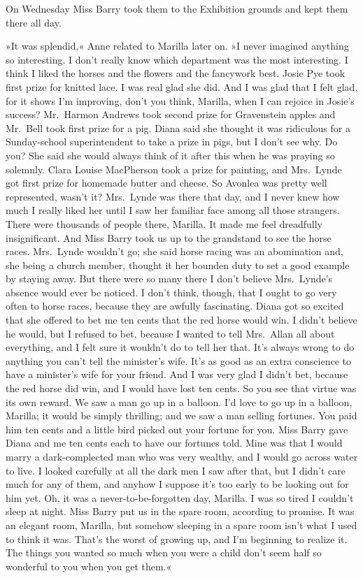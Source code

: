 On Wednesday Miss Barry took them to the Exhibition grounds and kept them there all day.

»It was splendid,« Anne related to Marilla later on. »I never imagined anything so interesting. I don't really know which department was the most interesting. I think I liked the horses and the flowers and the fancywork best. Josie Pye took first prize for knitted lace. I was real glad she did. And I was glad that I felt glad, for it shows I'm improving, don't you think, Marilla, when I can rejoice in Josie's success? Mr.~Harmon Andrews took second prize for Gravenstein apples and Mr.~Bell took first prize for a pig. Diana said she thought it was ridiculous for a Sunday-school superintendent to take a prize in pigs, but I don't see why. Do you? She said she would always think of it after this when he was praying so solemnly. Clara Louise MacPherson took a prize for painting, and Mrs.~Lynde got first prize for homemade butter and cheese. So Avonlea was pretty well represented, wasn't it? Mrs.~Lynde was there that day, and I never knew how much I really liked her until I saw her familiar face among all those strangers. There were thousands of people there, Marilla. It made me feel dreadfully insignificant. And Miss Barry took us up to the grandstand to see the horse races. Mrs.~Lynde wouldn't go; she said horse racing was an abomination and, she being a church member, thought it her bounden duty to set a good example by staying away. But there were so many there I don't believe Mrs.~Lynde's absence would ever be noticed. I don't think, though, that I ought to go very often to horse races, because they are awfully fascinating. Diana got so excited that she offered to bet me ten cents that the red horse would win. I didn't believe he would, but I refused to bet, because I wanted to tell Mrs.~Allan all about everything, and I felt sure it wouldn't do to tell her that. It's always wrong to do anything you can't tell the minister's wife. It's as good as an extra conscience to have a minister's wife for your friend. And I was very glad I didn't bet, because the red horse did win, and I would have lost ten cents. So you see that virtue was its own reward. We saw a man go up in a balloon. I'd love to go up in a balloon, Marilla; it would be simply thrilling; and we saw a man selling fortunes. You paid him ten cents and a little bird picked out your fortune for you. Miss Barry gave Diana and me ten cents each to have our fortunes told. Mine was that I would marry a dark-complected man who was very wealthy, and I would go across water to live. I looked carefully at all the dark men I saw after that, but I didn't care much for any of them, and anyhow I suppose it's too early to be looking out for him yet. Oh, it was a never-to-be-forgotten day, Marilla. I was so tired I couldn't sleep at night. Miss Barry put us in the spare room, according to promise. It was an elegant room, Marilla, but somehow sleeping in a spare room isn't what I used to think it was. That's the worst of growing up, and I'm beginning to realize it. The things you wanted so much when you were a child don't seem half so wonderful to you when you get them.«

